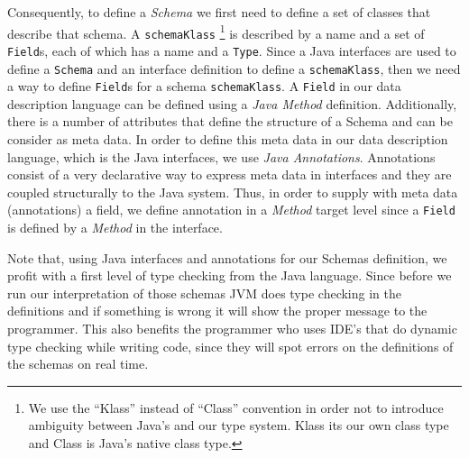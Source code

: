 Consequently, to define a \textit{Schema} we first need to define a set of classes that describe that schema.
A \texttt{schemaKlass} \footnote{
	We use the ``Klass'' instead of ``Class'' convention in order not to introduce ambiguity between Java's and our type system. Klass its our own class type and Class is Java's native class type.} 
is described by a name and a set of \texttt{Field}s, each of which has a name and a \texttt{Type}.
Since a Java interfaces are used to define a \texttt{Schema} and an interface definition to define a \texttt{schemaKlass}, then we need a way to define \texttt{Field}s for a schema \texttt{schemaKlass}.
A \texttt{Field} in our data description language can be defined using a \textit{Java Method} definition. 
Additionally, there is a number of attributes that define the structure of a Schema and can be consider as meta data.
In order to define this meta data in our data description language, which is the Java interfaces, we use \textit{Java Annotations}.
Annotations consist of a very declarative way to express meta data in interfaces and they are coupled structurally to the Java system.
Thus, in order to supply with meta data (annotations) a field, we define annotation in a \textit{Method} target level since a \texttt{Field} is defined by a \textit{Method} in the interface.

Note that, using Java interfaces and annotations for our Schemas definition, we profit with a first level of type checking from the Java language. 
Since before we run our interpretation of those schemas JVM does type checking in the definitions and if something is wrong it will show the proper message to the programmer.
This also benefits the programmer who uses IDE's that do dynamic type checking while writing code, since they will spot errors on the definitions of the schemas on real time. 

